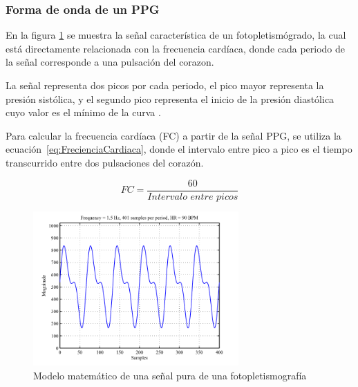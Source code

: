             \subsubsection{Forma de onda de un PPG}

            En la figura \ref{fig:PPG} se muestra la señal característica de un fotopletismógrado, la cual está directamente relacionada con la frecuencia cardíaca, donde cada periodo de la señal corresponde a una pulsación del corazon.

            La señal representa dos picos por cada periodo, el pico mayor representa la presión sistólica, y el segundo pico representa el inicio de la presión diastólica cuyo valor es el mínimo de la curva \cite{Celi_2011}.

            Para calcular la frecuencia cardíaca (FC) a partir de la señal PPG, se utiliza la ecuación~\ref{eq:FrecienciaCardiaca}, donde el intervalo entre pico a pico es el tiempo transcurrido entre dos pulsaciones del corazón.

            \begin{equation}
                \label{eq:FrecienciaCardiaca}
                FC = \frac{60}{\textit{Intervalo entre picos}}
            \end{equation}

            \begin{figure}[H]
                \centering
                \includegraphics[width=0.7\textwidth]{img/PPG_senial.png}
                \caption[Modelo matemático de una señal pura de una fotopletismografía]{Modelo matemático de una señal pura de una fotopletismografía\footnotemark}
                \label{fig:PPG}
            \end{figure}

